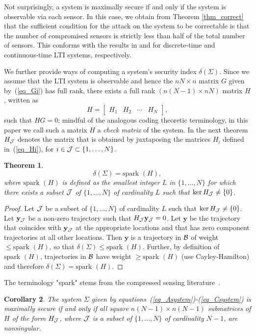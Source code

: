 \documentclass[letterpaper, 10 pt, conference]{ieeeconf}
\newcommand{\B}{{\cal B}}
\newcommand{\J}{{\cal J}}
\newcommand{\spark}{\mbox{spark }}
\newcommand{\ybold}{\mathbf{y}}
\newcommand{\beq}{\begin{equation}}
\newcommand{\eeq}{\end{equation}}
\newcommand{\bmat}{\left[ \begin{array}}
\newcommand{\emat}{\end{array} \right]}
\newtheorem{thm}{Theorem}[section]
\newtheorem{cor}[thm]{Corollary}
\begin{document}
Not surprisingly, a system is maximally secure if and only if the system is observable via each sensor. In this case, we obtain from Theorem \ref{thm_correct} that the sufficient condition for the attack on the system to be correctable is that the number of compromised sensors is strictly less than half of the total number of sensors. This conforms with the results in \cite{fawziTD14} and \cite{ChongWakaikiHespanhaACC15} for discrete-time and continuous-time LTI systems, respectively.

We further provide ways of computing a system's security index $\delta(\Sigma)$. Since we assume that the LTI system is observable and hence the $nN \times n$ matrix $G$ given by~(\ref{eq_Gi}) has full rank, there exists a full rank $(n(N - 1) \times nN)$ matrix $H$, written as 
\beq
H = \bmat{cccc} H_1 & H_2 & \cdots & H_N \emat ,\label{eq_Hi}
\eeq
such that $HG = 0$; mindful of the analogous coding theoretic terminology, in this paper we call such a matrix $H$ a {\em check matrix} of the system. In the next theorem $H_\J $ denotes the matrix that is obtained by juxtaposing the matrices $H_i$ defined in~(\ref{eq_Hi}), for $i\in \J \subset \{1,\ldots , N\}$.
\begin{thm}\label{thm_HJ}
\[
\delta (\Sigma ) = \spark(H), 
\]
where $\spark(H)$ is defined as the smallest integer $L$ in $\{1,\ldots , N\}$ for which there exists a subset $\J$ of $\{1,\ldots , N\}$ of cardinality $L$ such that $\ker H_\J \neq \{ 0 \}$. 
\end{thm} 
\begin{proof}
		Let $\J$ be a subset of $\{1,\ldots , N\}$ of cardinality $L$ such that $\ker H_\J \neq \{ 0 \}$. Let $\ybold_\J$ be a non-zero trajectory such that $H_\J \ybold_\J =0$. Let $\ybold $ be the trajectory that coincides with $\ybold_\J$ at the appropriate locations and that has zero component trajectories at all other locations. Then $\ybold$ is a trajectory in $\B$ of weight $\leq \spark(H)$, so that $\delta (\Sigma ) \leq \spark(H)$. Further, by definition of $\spark(H)$, trajectories in $\B$ have weight $\geq \spark(H)$ (use Cayley-Hamilton) and therefore $\delta (\Sigma ) = \spark(H) $. 
\end{proof}

The terminology "spark" stems from the compressed sensing literature~\cite{TillmannP14}.

\begin{cor}
The system $\Sigma$ given by equations~(\ref{eq_Asystem})-(\ref{eq_Csystem}) is maximally secure if and only if all square $n(N - 1) \times n(N - 1)$ submatrices of $H$ of the form $H_\J $, where $\J$ is a subset of $\{1,\ldots , N\}$ of cardinality $N-1$, are nonsingular.
\end{cor}
\end{document}
